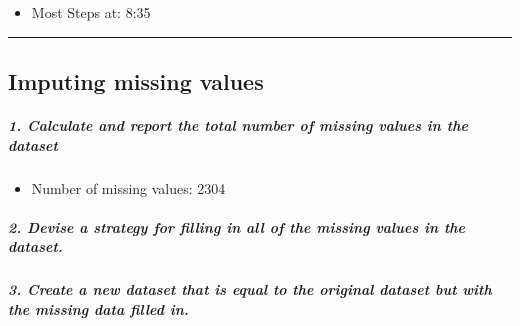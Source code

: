 \documentclass[]{article}
\newenvironment{Shaded}{\begin{snugshade}}{\end{snugshade}}
\newcommand{\DataTypeTok}[1]{\textcolor[rgb]{0.13,0.29,0.53}{#1}}
\newcommand{\KeywordTok}[1]{\textcolor[rgb]{0.13,0.29,0.53}{\textbf{#1}}}
\newcommand{\NormalTok}[1]{#1}
\newcommand{\OperatorTok}[1]{\textcolor[rgb]{0.81,0.36,0.00}{\textbf{#1}}}
\newcommand{\StringTok}[1]{\textcolor[rgb]{0.31,0.60,0.02}{#1}}
\providecommand{\tightlist}{%
  \setlength{\itemsep}{0pt}\setlength{\parskip}{0pt}}
\let\oldsubparagraph\subparagraph
\renewcommand{\subparagraph}[1]{\oldsubparagraph{#1}\mbox{}}
\begin{document}
\begin{itemize}
\tightlist
\item
  Most Steps at: 8:35
\end{itemize}

\begin{center}\rule{0.5\linewidth}{\linethickness}\end{center}

\hypertarget{imputing-missing-values}{%
\subsection{Imputing missing values}\label{imputing-missing-values}}

\hypertarget{calculate-and-report-the-total-number-of-missing-values-in-the-dataset}{%
\subparagraph{1. Calculate and report the total number of missing values
in the
dataset}\label{calculate-and-report-the-total-number-of-missing-values-in-the-dataset}}

\begin{Shaded}
\end{Shaded}

\begin{itemize}
\tightlist
\item
  Number of missing values: 2304
\end{itemize}

\hypertarget{devise-a-strategy-for-filling-in-all-of-the-missing-values-in-the-dataset.}{%
\subparagraph{2. Devise a strategy for filling in all of the missing
values in the
dataset.}\label{devise-a-strategy-for-filling-in-all-of-the-missing-values-in-the-dataset.}}

\hypertarget{create-a-new-dataset-that-is-equal-to-the-original-dataset-but-with-the-missing-data-filled-in.}{%
\subparagraph{3. Create a new dataset that is equal to the original
dataset but with the missing data filled
in.}\label{create-a-new-dataset-that-is-equal-to-the-original-dataset-but-with-the-missing-data-filled-in.}}

\begin{Shaded}
\end{Shaded}
\end{document}
